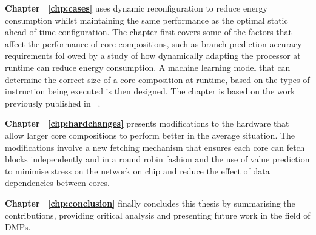 \textbf{Chapter ~\ref{chp:cases}} uses dynamic reconfiguration to reduce energy consumption whilst maintaining the same performance as the optimal static ahead of time configuration.
The chapter first covers some of the factors that affect the performance of core compositions, such as branch prediction accuracy requirements fol owed by a study of how dynamically adapting the processor at runtime can reduce energy consumption.
A machine learning model that can determine the correct size of a core composition at runtime, based on the types of instruction being executed is then designed.
The chapter is based on the work previously published in ~\cite{micolet2017cases}.

\textbf{Chapter ~\ref{chp:hardchanges}} presents modifications to the hardware that allow larger core compositions to perform better in the average situation.
The modifications involve a new fetching mechanism that ensures each core can fetch blocks independently and in a round robin fashion and the use of value prediction to minimise stress on the network on chip and reduce the effect of data dependencies between cores.

\textbf{Chapter ~\ref{chp:conclusion}} finally concludes this thesis by summarising the contributions, providing critical analysis and presenting future work in the field of DMPs.